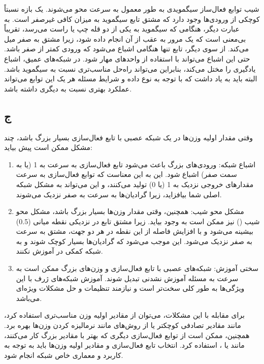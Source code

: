 \documentclass{article}
\begin{document}
شیب توابع فعال‌ساز سیگمویدی به طور معمول به سرعت محو می‌شوند. یک بازه نسبتاً کوچکی از ورودی‌ها وجود دارد که مشتق تابع سیگموید به میزان کافی غیرصفر است. به عبارت دیگر، هنگامی که سیگموید به یکی از دو قله چپ یا راست می‌رسد، تقریباً بی‌معنی است که یک مرور به عقب از آن انجام داده شود، زیرا مشتق به صفر میل می‌کند. از سوی دیگر، تابع  تنها هنگامی اشباع می‌شود که ورودی کمتر از صفر باشد. حتی این اشباع می‌تواند با استفاده از واحدهای  مهار شود. در شبکه‌های عمیق، اشباع یادگیری را مختل می‌کند، بنابراین  می‌تواند راه‌حل مناسب‌تری نسبت به سیگموید باشد. البته باید به یاد داشت که با توجه به نوع داده و شرایط مسئله هر یک این توابع می‌تواند عملکرد بهتری نسبت به دیگری داشته باشد.
\subsection{ج}

وقتی مقدار اولیه وزن‌ها در یک شبکه عصبی با تابع فعال‌سازی  بسیار بزرگ باشد، چند مشکل ممکن است پیش بیاید:
\begin{enumerate}
\item    اشباع شبکه: ورودی‌های بزرگ باعث می‌شود تابع فعال‌سازی  به سرعت به 1 (یا به سمت صفر) اشباع شود. این به این معناست که توابع فعال‌سازی  به سرعت مقدار‌های خروجی نزدیک به 1 (یا 0) تولید می‌کنند، و این می‌تواند به مشکل شبکه اصلی شما بیافزاید، زیرا گرادیان‌ها به سرعت به صفر نزدیک می‌شوند.

\item    مشکل محو شیب: همچنین، وقتی مقدار وزن‌ها بسیار بزرگ باشد، مشکل محو شیب () نیز ممکن است به وجود بیاید. زیرا مشتق تابع  در نزدیکی نقطه میانی (0.5) بیشینه می‌شود و با افزایش فاصله از این نقطه در هر دو جهت، مشتق به سرعت به صفر نزدیک می‌شود. این موجب می‌شود که گرادیان‌ها بسیار کوچک شوند و به شبکه کمکی در آموزش نکنند.

\item    سختی آموزش: شبکه‌های عصبی با تابع فعال‌سازی  و وزن‌های بزرگ ممکن است به سرعت به مسئله آموزش نشدنی تبدیل شوند. آموزش شبکه‌های ژرف با این ویژگی‌ها به طور کلی سخت‌تر است و نیازمند تنظیمات و حل مشکلات ویژه‌ای می‌باشد.
\end{enumerate}

برای مقابله با این مشکلات، می‌توان از مقادیر اولیه وزن مناسب‌تری استفاده کرد، مانند مقادیر تصادفی کوچکتر یا از روش‌های مانند نرمالیزه کردن وزن‌ها بهره برد. همچنین، ممکن است از توابع فعال‌سازی دیگری که بهتر با مقادیر بزرگ کار می‌کنند، مانند  یا ، استفاده کرد. انتخاب تابع فعال‌سازی و مقادیر اولیه وزن‌ها باید به توجه به کاربرد و معماری خاص شبکه انجام شود.
\end{document}

